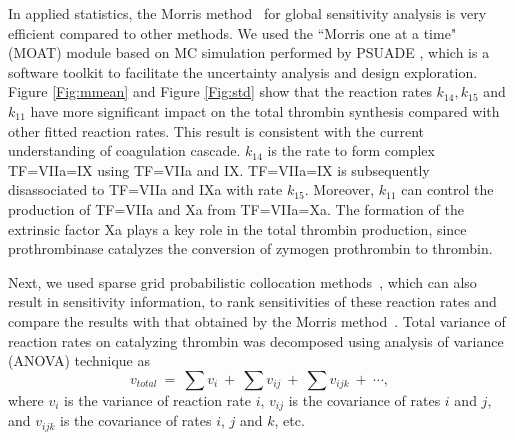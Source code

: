 In applied statistics, the Morris method~\cite{Morris91} for global
sensitivity analysis is very efficient compared to other methods. We
used the ``Morris one at a time" (MOAT) module based on MC
simulation performed by PSUADE \cite{PSUADE}, which is a software
toolkit to facilitate the uncertainty analysis and design
exploration. Figure \ref{Fig:mmean} and Figure \ref{Fig:std} show
that the reaction rates $k_{14},k_{15}$ and $k_{11}$ have more
significant impact on the total thrombin synthesis compared with
other fitted reaction rates. This result is consistent with the
current understanding of coagulation cascade.
 $k_{14}$ is the rate to form complex TF=VIIa=IX
using TF=VIIa and IX. TF=VIIa=IX is subsequently disassociated to
TF=VIIa and IXa with rate $k_{15}$. Moreover, $k_{11}$ can control
the production of TF=VIIa and Xa from TF=VIIa=Xa. The formation of
the extrinsic factor Xa plays a key role in the total thrombin
production, since prothrombinase  catalyzes the conversion of
zymogen prothrombin to thrombin.

Next, we used sparse grid probabilistic collocation
methods~\cite{DBJSH, LinAMTAWR, LinAMTJSC}, which can also result in
sensitivity information, to rank sensitivities of these reaction
rates and compare the results with that obtained by the Morris
method~\cite{Morris91}. Total variance of reaction rates on
catalyzing thrombin was decomposed using analysis of variance
(ANOVA) technique as
\[v_{total}~=~\sum v_i ~+~\sum v_{ij}~+~\sum v_{ijk}~+~\cdots,\]
where $v_i$ is the variance of reaction rate $i$, $v_{ij}$ is the
covariance of rates $i$ and $j$, and $v_{ijk}$ is the covariance of
rates $i$, $j$ and $k$, etc.

